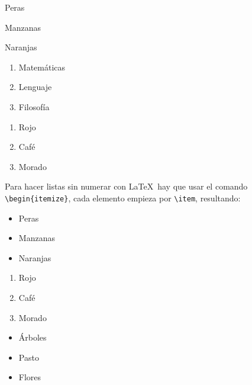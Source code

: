 		\begin{multicols}{3}
			\begin{enumeratebf}[label=\alph*) ] %
				\item Peras
				\item Manzanas
				\item Naranjas
			\end{enumeratebf}

			\begin{enumerate}[label=\greek*) ]
				\item Matemáticas
				\item Lenguaje
				\item Filosofía
			\end{enumerate}

			\begin{enumerate}[label=\roman*) ]
				\item Rojo
				\item Café
				\item Morado
			\end{enumerate}
		\end{multicols}

		Para hacer listas sin numerar con \LaTeX\ hay que usar el comando \texttt{\textbackslash begin\{itemize\}}, cada elemento empieza por \texttt{\textbackslash item}, resultando:

		\begin{multicols}{3}
			\begin{itemize}[label={--}]
				\item Peras
				\item Manzanas
				\item Naranjas
			\end{itemize}

			\begin{enumerate}[label={*}]
				\item Rojo
				\item Café
				\item Morado
			\end{enumerate}

			\begin{itemize}
				\item Árboles
				\item Pasto
				\item Flores
			\end{itemize}
		\end{multicols}


